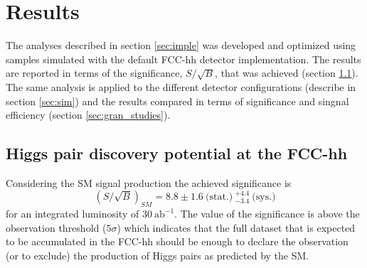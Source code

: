 
\section{Results}
\label{sec:resul}


The analyses described in section \ref{sec:imple} was developed and optimized using samples simulated with the default FCC-hh detector implementation. The results are reported in terms of the significance, $S/\sqrt{B}$, that was achieved (section \ref{sec:results_FCC}). The same analysis is applied to the different detector configurations (describe in section \ref{sec:sim}) and the results compared in terms of significance and singnal efficiency (section \ref{sec:gran_studies}).  

\subsection{Higgs pair discovery potential at the FCC-hh}
\label{sec:results_FCC}

Considering the SM signal production the achieved significance is
\begin{equation}
	(S/\sqrt{B})_{SM}=8.8\pm 1.6~\text{(stat.)}~^{+4.4}_{-3.4}~\text{(sys.)}
\end{equation}
for an integrated luminosity of $30~\text{ab}^{-1}$. The value of the significance is above the observation threshold ($5\sigma$) which indicates that the full dataset that is expected to be accumulated in the FCC-hh should be enough to declare the observation (or to exclude) the production of Higgs pairs as predicted by the SM.

